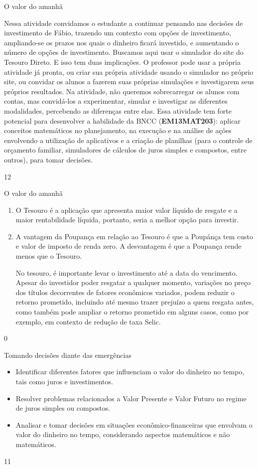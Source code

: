 \marginpar{\vspace{-2.5em}}
\begin{sugestions}{O valor do amanhã}
{
Nessa atividade convidamos o estudante a continuar pensando nas decisões de investimento de Fábio, trazendo um contexto com opções de investimento, ampliando-se os prazos nos quais o dinheiro ficará investido, e aumentando o número de opções de investimento.
Buscamos aqui usar o simulador do site do Tesouro Direto. E isso tem duas implicações. O professor pode usar a própria atividade já pronta, ou criar sua própria atividade usando o simulador no próprio site, ou convidar os alunos a fazerem suas próprias simulações e investigarem seus próprios resultados.
Na atividade, não queremos sobrecarregar os alunos com contas, mas convidá-los a experimentar, simular e investigar as diferentes modalidades, percebendo as diferenças entre elas.
Essa atividade tem forte potencial para desenvolver a habilidade da BNCC (\textbf{EM13MAT203}): aplicar conceitos matemáticos no planejamento, na execução e na análise de ações envolvendo a utilização de aplicativos e a criação de planilhas (para o controle de orçamento familiar, simuladores de cálculos de juros simples e compostos, entre outros), para tomar decisões.

}{1}{2}
\end{sugestions}
\begin{answer}{O valor do amanhã}
{
  \begin{enumerate}
    \item O Tesouro é a aplicação que apresenta maior valor líquido de resgate e a maior rentabilidade líquida, portanto, seria a melhor opção para investir.
    \item A vantagem da Poupança em relação ao Tesouro é que a Poupánça tem custo e valor de imposto de renda zero. A desvantagem é que a Poupança rende menos que o Tesouro.

    No tesouro, é importante levar o investimento até a data do vencimento. Apesar do investidor poder resgatar a qualquer momento, variações no preço dos títulos decorrentes de fatores econômicos variados, podem reduzir o retorno prometido, incluindo até mesmo trazer prejuízo a quem resgata antes, como também pode ampliar o retorno prometido em alguns casos, como por exemplo, em contexto de redução de taxa Selic. 
  \end{enumerate}
}{0}
\end{answer}
\clearmargin
\begin{objectives}{Tomando decisões diante das emergências}
{
\begin{itemize}
\item Identificar diferentes fatores que influenciam o valor do dinheiro no tempo, tais como juros e investimentos.
\item Resolver problemas relacionados a Valor Presente e Valor Futuro no regime de juros simples ou compostos.
\item Analisar e tomar decisões em situações econômico-financeiras que envolvam o valor do dinheiro no tempo, considerando aspectos matemáticos e não matemáticos.
\end{itemize}
}{1}{1}
\end{objectives}
